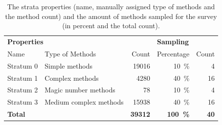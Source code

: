 \documentclass[%
class=scrreprt,
chapterprefix=false,%
open=right,%
twoside=false,%
paper=a4,%
logofile={Logo\_zentral\_farbig\_EN.png},%
thesistype=master,%
UKenglish,%
]{se2thesis}
\theoremstyle{definition}
\newcommand{\numOriginal}{39312\xspace}
\begin{document}
		

	
%
	
	\begin{table}[tb]
		\centering
		\caption{The strata properties (name, manually assigned type of methods and the method count) and the amount of methods sampled for the survey (in percent and the total count).}
		\label{tab:strata_info}
		\begin{tabular}{llr|rr}
			\toprule
			\multicolumn{3}{l|}{\textbf{Properties}} & \multicolumn{2}{l}{\textbf{Sampling}} \\
			Name & Type of Methods & Count & Percentage & Count \\
			\midrule
			Stratum 0 & Simple methods & 19016 & 10~\% & 4 \\
			Stratum 1 & Complex methods & 4280 & 40~\% & 16 \\
			Stratum 2 & Magic number methods & 78 & 10~\% & 4 \\
			Stratum 3 & Medium complex methods & 15938 & 40~\% & 16 \\
			\midrule
			\textbf{Total} & & \textbf{\numOriginal} & \textbf{100~\%} & \textbf{40} \\
			\bottomrule
		\end{tabular}
	\end{table}
	
\end{document}
